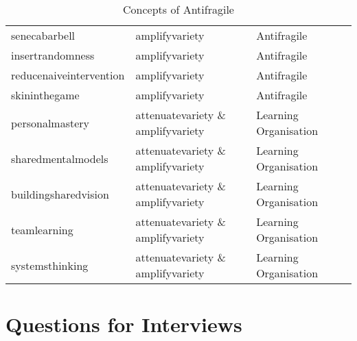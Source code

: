 \begin{table}[!h]
\begin{center}
{\begin{tabular}{@{}llll@{}}
			\Gls{senecabarbell} & \Gls{amplifyvariety} & Antifragile & \parencite{Botjes2020} \\
			\Gls{insertrandomness} & \Gls{amplifyvariety} & Antifragile & \parencite{Botjes2020} \\			
			\Gls{reducenaiveintervention} & \Gls{amplifyvariety} & Antifragile & \parencite{Botjes2020} \\
			\Gls{skininthegame} & \Gls{amplifyvariety} & Antifragile & \parencite{Botjes2020} \\
			\Gls{personalmastery} & \Gls{attenuatevariety} \& \Gls{amplifyvariety} & Learning Organisation & \parencite{Botjes2020} \\
			\Gls{sharedmentalmodels} & \Gls{attenuatevariety} \& \Gls{amplifyvariety} & Learning Organisation & \parencite{Botjes2020} \\
			\Gls{buildingsharedvision} & \Gls{attenuatevariety} \& \Gls{amplifyvariety} & Learning Organisation & \parencite{Botjes2020} \\
			\Gls{teamlearning} & \Gls{attenuatevariety} \& \Gls{amplifyvariety} & Learning Organisation & \parencite{Botjes2020} \\
			\Gls{systemsthinking} & \Gls{attenuatevariety} \& \Gls{amplifyvariety} & Learning Organisation & \parencite{Botjes2020} \\
			\bottomrule
		\end{tabular}
		}
		\caption{Concepts of Antifragile}
	\end{center}
\end{table}

\section{Questions for Interviews}
\label{sec:questionsforinterviews}


